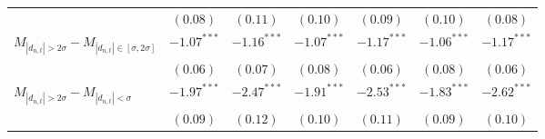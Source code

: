 \begin{tabular}{lcccccc}
   & $(0.08)$ & $(0.11)$ & $(0.10)$ & $(0.09)$ & $(0.10)$ & $(0.08)$ \\ 
  $M_{|d_{n,t}| > 2 \sigma} - M_{|d_{n,t}| \in [\sigma, 2\sigma]}$ & $-1.07^{***}$ & $-1.16^{***}$ & $-1.07^{***}$ & $-1.17^{***}$ & $-1.06^{***}$ & $-1.17^{***}$ \\ 
   & $(0.06)$ & $(0.07)$ & $(0.08)$ & $(0.06)$ & $(0.08)$ & $(0.06)$ \\ 
  $M_{|d_{n,t}| > 2 \sigma} - M_{|d_{n,t}| < \sigma}$ & $-1.97^{***}$ & $-2.47^{***}$ & $-1.91^{***}$ & $-2.53^{***}$ & $-1.83^{***}$ & $-2.62^{***}$ \\ 
   & $(0.09)$ & $(0.12)$ & $(0.10)$ & $(0.11)$ & $(0.09)$ & $(0.10)$ \\ 
   \hline 
\end{tabular}
